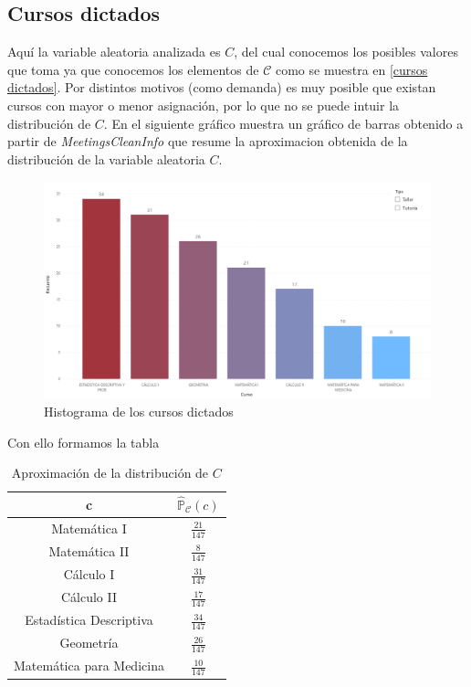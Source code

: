 \documentclass[11pt,a4paper]{book}
\theoremstyle{definition}%
\newcommand{\Probsymb}{\mathds{P}}
\begin{document}
            \subsection{Cursos dictados}
                Aquí la variable aleatoria analizada es $C$, del cual conocemos los posibles valores que toma ya que conocemos los elementos de $\mathcal{C}$ como se muestra en \ref{cursos dictados}. Por distintos motivos (como demanda) es muy posible que existan cursos con mayor o menor asignación, por lo que no se puede intuir la distribución de $C$. En el siguiente gráfico muestra un gráfico de barras obtenido a partir de \textit{MeetingsCleanInfo} que resume la aproximacion obtenida de la distribución de la variable aleatoria $C$.
                \begin{figure}[H]
                    \centering
                    \includegraphics[width=1\textwidth]{Sources/histograma_CursosGlobal.png}
                    \caption{Histograma de los cursos dictados}
                    \label{fig:histograma_CursosGlobal}
                \end{figure}
                Con ello formamos la tabla
                \begin{table}[H]
                    \centering
                    \begin{tabular}{|c|c|}
                        \hline
                        c & $\hat{\Probsymb}_{\mathcal{C}}(c)$ \\ \hline
                        Matemática I & $\frac{21}{147}$ \\ \hline
                        Matemática II & $\frac{8}{147}$ \\ \hline
                        Cálculo I & $\frac{31}{147}$ \\ \hline
                        Cálculo II & $\frac{17}{147}$ \\ \hline
                        Estadística Descriptiva & $\frac{34}{147}$ \\ \hline
                        Geometría & $\frac{26}{147}$ \\ \hline
                        Matemática para Medicina & $\frac{10}{147}$ \\ \hline
                    \end{tabular}
                    \caption{Aproximación de la distribución de $C$}
                \end{table}
\end{document}
